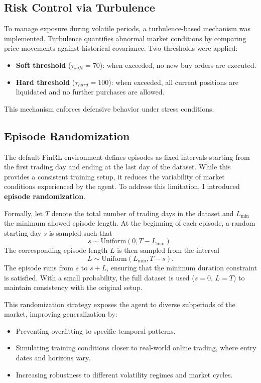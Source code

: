 \documentclass[12pt,a4paper]{report}
\begin{document}
\subsection{Risk Control via Turbulence}
To manage exposure during volatile periods, a turbulence-based mechanism was implemented. Turbulence quantifies abnormal market conditions by comparing price movements against historical covariance. Two thresholds were applied:
\begin{itemize}
    \item \textbf{Soft threshold} ($\tau_{soft} = 70$): when exceeded, no new buy orders are executed.
    \item \textbf{Hard threshold} ($\tau_{hard} = 100$): when exceeded, all current positions are liquidated and no further purchases are allowed.
\end{itemize}

This mechanism enforces defensive behavior under stress conditions.

\subsection{Episode Randomization}
The default FinRL environment defines episodes as fixed intervals starting from the first trading day and ending at the last day of the dataset. While this provides a consistent training setup, it reduces the variability of market conditions experienced by the agent. To address this limitation, I introduced \textbf{episode randomization}.

Formally, let $T$ denote the total number of trading days in the dataset and $L_{\min}$ the minimum allowed episode length. At the beginning of each episode, a random starting day $s$ is sampled such that
\[
s \sim \text{Uniform}(0, T - L_{\min}).
\]
The corresponding episode length $L$ is then sampled from the interval
\[
L \sim \text{Uniform}(L_{\min}, T - s).
\]
The episode runs from $s$ to $s + L$, ensuring that the minimum duration constraint is satisfied. With a small probability, the full dataset is used ($s=0$, $L=T$) to maintain consistency with the original setup.

This randomization strategy exposes the agent to diverse subperiods of the market, improving generalization by:
\begin{itemize}
    \item Preventing overfitting to specific temporal patterns.
    \item Simulating training conditions closer to real-world online trading, where entry dates and horizons vary.
    \item Increasing robustness to different volatility regimes and market cycles.
\end{itemize}
\end{document}
